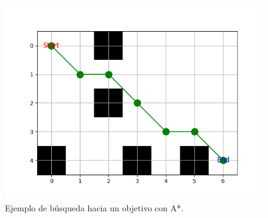 \begin{figure}[H]
  \centering
  \includegraphics[scale=0.6]{figs/astar4} %
  \caption{ Ejemplo de búsqueda hacia un objetivo con A*.}
  \label{fig:mel}
\end{figure}

